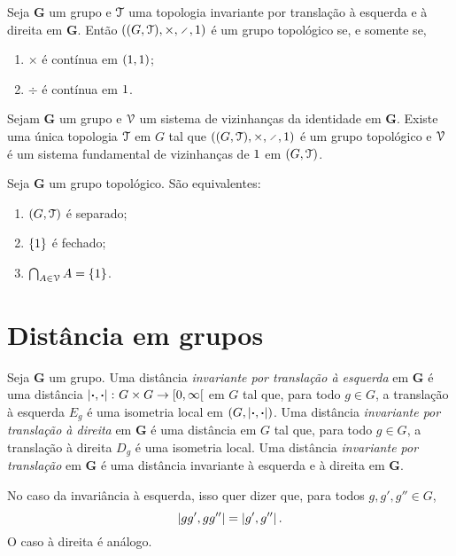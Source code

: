 \begin{proposition}
Seja $\bm G$ um grupo e $\mathcal{T}$ uma topologia invariante por translação à esquerda e à direita em $\bm G$. Então $((G,\topo),\times,\div,\id)$ é um grupo topológico se, e somente se,
	\begin{enumerate}
	\item $\times$ é contínua em $(1,1)$;
	\item $\div$ é contínua em $1$.
	\end{enumerate}
\end{proposition}

\begin{proposition}
Sejam $\bm G$ um grupo e $\mathcal{V}$ um sistema de vizinhanças da identidade em $\bm G$. Existe uma única topologia $\mathcal{T}$ em $G$ tal que $((G,\topo),\times,\div,\id)$ é um grupo topológico e $\mathcal{V}$ é um sistema fundamental de vizinhanças de $1$ em $(G,\mathcal{T})$.
\end{proposition}

\begin{proposition}
Seja $\bm G$ um grupo topológico. São equivalentes:
	\begin{enumerate}
	\item $(G,\mathcal{T})$ é separado;
	\item $\{1\}$ é fechado;
	\item $\bigcap_{A \in \mathcal{V}} A = \{1\}$.
	\end{enumerate}
\end{proposition}

\section{Distância em grupos}

\begin{definition}
Seja $\bm G$ um grupo. Uma distância \emph{invariante por translação à esquerda} em $\bm G$ é uma distância $\left\vert{\bm{\cdot}},{\bm{\cdot}}\right\vert\colon G \times G \to \left[{0},{\infty}\right[$ em $G$ tal que, para todo $g \in G$, a translação à esquerda $E_g$ é uma isometria local em $(G,\left\vert{\bm{\cdot}},{\bm{\cdot}}\right\vert)$. Uma distância \emph{invariante por translação à direita} em $\bm G$ é uma distância em $G$ tal que, para todo $g \in G$, a translação à direita $D_g$ é uma isometria local. Uma distância \emph{invariante por translação} em $\bm G$ é uma distância invariante à esquerda e à direita em $\bm G$.
\end{definition}

No caso da invariância à esquerda, isso quer dizer que, para todos $g,g',g'' \in G$,
	\begin{equation*}
	\left\vert{gg'},{gg''}\right\vert = \left\vert{g'},{g''}\right\vert.
	\end{equation*}
O caso à direita é análogo.

